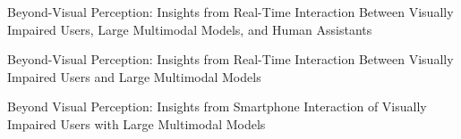 Beyond-Visual Perception: Insights from Real-Time Interaction Between Visually Impaired Users, Large Multimodal Models, and Human Assistants

Beyond-Visual Perception: Insights from Real-Time Interaction Between Visually Impaired Users and Large Multimodal Models 


Beyond Visual Perception: Insights from Smartphone Interaction of Visually Impaired Users with Large Multimodal Models